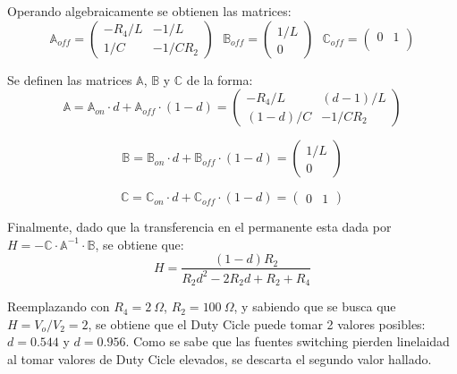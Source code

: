 Operando algebraicamente se obtienen las matrices: 
\begin{equation}
\mathbb{A}_{off} =  \begin{pmatrix}
	-R_4/L & -1/L \\
	1/C & -1/ C R_2
\end{pmatrix} \ \ \
\mathbb{B}_{off} =  \begin{pmatrix}
	1/L \\
	0
\end{pmatrix} \ \ \
\mathbb{C}_{off} =  \begin{pmatrix}
	0 & 1 \\
\end{pmatrix}
\end{equation}

Se definen las matrices $\mathbb{A}$, $\mathbb{B}$ y $\mathbb{C}$ de la forma:
\begin{equation}
\mathbb{A} = \mathbb{A}_{on} \cdot d + \mathbb{A}_{off} \cdot (1-d) =  \begin{pmatrix}
	-R_4/L & (d-1)/L \\
	(1-d)/C & -1/ C R_2
\end{pmatrix}
\end{equation}

\begin{equation}
\mathbb{B} = \mathbb{B}_{on} \cdot d + \mathbb{B}_{off} \cdot (1-d) = \begin{pmatrix}
	1/L \\
	0
\end{pmatrix}
\end{equation}

\begin{equation}
\mathbb{C} = \mathbb{C}_{on} \cdot d + \mathbb{C}_{off} \cdot (1-d) = \begin{pmatrix}
	0 & 1
\end{pmatrix}
\end{equation}

Finalmente, dado que la transferencia en el permanente esta dada por $H = -\mathbb{C} \cdot \mathbb{A}^{-1} \cdot \mathbb{B}$, se obtiene que:
\begin{equation}
H = \frac{\left( 1 - d \right) R_2}{R_2 d^2 - 2 R_2 d + R_2 + R_4}
\end{equation}

Reemplazando con $R_4 = 2 \ \Omega$, $R_2 = 100 \ \Omega$, y sabiendo que se busca que $H = V_o / V_2 = 2$, se obtiene que el Duty Cicle puede tomar 2 valores posibles: $d = 0.544$ y $d = 0.956$. Como se sabe que las fuentes switching pierden linelaidad al tomar valores de Duty Cicle elevados, se descarta el segundo valor hallado.

